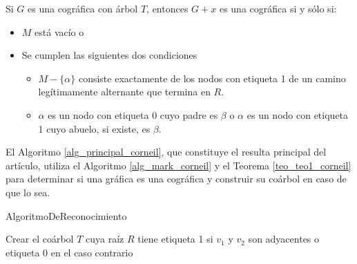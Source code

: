 \begin{theorem}
    \label{teo_teo1_corneil}
    Si $G$ es una cográfica con árbol $T$, entonces $G+x$ es una cográfica si y sólo si:
    \begin{itemize}
        \item $M$ está vacío o
        \item Se cumplen las siguientes dos condiciones
        \begin{itemize}
            \item $M-\{\alpha\}$ consiste exactamente de los nodos con etiqueta 1 de un camino legítimamente alternante que termina en $R$.
            \item $\alpha$ es un nodo con etiqueta 0 cuyo padre es $\beta$ o $\alpha$ es un nodo con etiqueta 1 cuyo abuelo, si existe, es $\beta$.
        \end{itemize}
    \end{itemize}
\end{theorem}

El Algoritmo \ref{alg_principal_corneil}, que constituye el resulta principal del artículo, utiliza el Algoritmo \ref{alg_mark_corneil} y el Teorema \ref{teo_teo1_corneil} para determinar si una gráfica es una cográfica y construir su coárbol en caso de que lo sea.

\begin{algorithm}[!htbp]
\caption{AlgoritmoDeReconocimiento}
\label{alg_principal_corneil}
\DontPrintSemicolon %

Crear el coárbol $T$ cuya raíz $R$ tiene etiqueta 1 si $v_1$ y $v_2$ son adyacentes o etiqueta 0 en el caso contrario\;


\end{algorithm}

